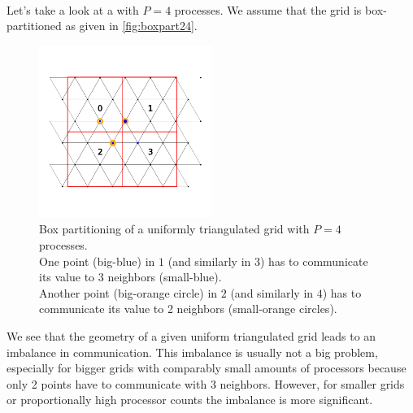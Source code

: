 \\
Let's take a look at a  with $P=4$ processes. We assume that the grid is box-partitioned as given in \autoref{fig:boxpart24}.\\
\begin{figure}[H]
    \centering
    \includegraphics[width=0.5\textwidth]{../fig/lab2/grid24.png}
    \caption{Box partitioning of a uniformly triangulated grid with $P=4$ processes.\\
    One point (big-blue) in $1$ (and similarly in $3$) has to communicate its value to 3 neighbors (small-blue).\\
    Another point (big-orange circle) in $2$ (and similarly in $4$) has to communicate its value to 2 neighbors (small-orange circles).}
    \label{fig:boxpart24}
\end{figure}
We see that the geometry of a given uniform triangulated grid leads to an imbalance in communication. This imbalance is usually not a big problem, especially for bigger grids with comparably small amounts of processors because only 2 points have to communicate with 3 neighbors. However, for smaller grids or proportionally high processor counts the imbalance is more significant.\\ 

